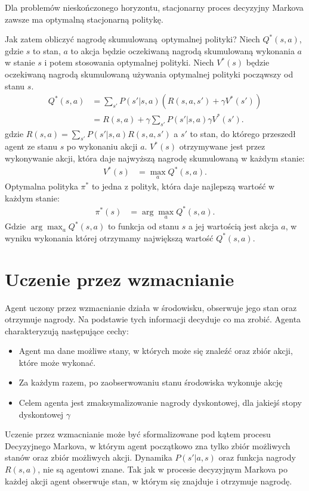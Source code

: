 \documentclass[a4paper, 12pt,oneside]{book}
\begin{document}
Dla problemów nieskończonego horyzontu, stacjonarny proces decyzyjny Markova
zawsze ma optymalną stacjonarną politykę.\cite{ai_foundations_policies}

Jak zatem obliczyć nagrodę skumulowaną optymalnej polityki? Niech $Q^*(s,a)$,
gdzie $s$ to stan, $a$ to akcja będzie oczekiwaną nagrodą skumulowaną wykonania
$a$ w stanie $s$ i potem stosowania optymalnej polityki. Niech $V^*(s)$ będzie
oczekiwaną nagrodą skumulowaną używania optymalnej polityki począwszy od stanu
$s$.
\begin{equation} \label{optimal_policy_1}
\begin{split}
	Q^*(s,a) &= \sum_{s'}P(s'|s,a)(R(s,a,s') + \gamma V^*(s'))\\
	&= R(s,a) + \gamma \sum_{s'}P(s'|s,a) \gamma V^*(s').
\end{split}
\end{equation}
gdzie $R(s,a) = \sum_{s'}P(s'|s,a)R(s,a,s')$ a $s'$ to stan, do którego
przeszedł agent ze stanu $s$ po wykonaniu akcji $a$.
$V^*(s)$ otrzymywane jest przez wykonywanie akcji, która daje najwyższą nagrodę
skumulowaną w każdym stanie:
\begin{equation} \label{optimal_policy_2}
\begin{split}
	V^*(s) &= \max_{a} Q^*(s,a).
\end{split}
\end{equation}
Optymalna polityka $\pi^*$ to jedna z polityk, która daje najlepszą wartość w
każdym stanie:
\begin{equation} \label{optimal_policy_3}
\begin{split}
	\pi^*(s) &= \arg\max_{a} Q^*(s,a).
\end{split}
\end{equation}
Gdzie $\arg\max_{a} Q^*(s,a)$ to funkcja od stanu $s$ a jej wartością jest
akcja $a$, w wyniku wykonania której otrzymamy największą wartość $Q^*(s,a)$.

\section{Uczenie przez wzmacnianie}
Agent uczony przez wzmacnianie działa w środowisku, obserwuje jego stan oraz
otrzymuje nagrody. Na podstawie tych informacji decyduje co ma zrobić. Agenta
charakteryzują następujące cechy:
\begin{itemize}
	\setlength\itemsep{-0.4em}
\item Agent ma dane możliwe stany, w których może się znaleźć oraz zbiór akcji,
	które może wykonać.
\item Za każdym razem, po zaobserwowaniu stanu środowiska wykonuje akcję
\item Celem agenta jest zmaksymalizowanie nagrody dyskontowej, dla jakiejś
	stopy dyskontowej $\gamma$
\end{itemize}
Uczenie przez wzmacnianie może być sformalizowane pod kątem procesu Decyzyjnego
Markova, w którym agent początkowo zna tylko zbiór możliwych stanów oraz zbiór
możliwych akcji. Dynamika $P(s'|a,s)$ oraz funkcja nagrody $R(s,a)$, nie są
agentowi znane. Tak jak w procesie decyzyjnym Markova po każdej akcji agent
obserwuje stan, w którym się znajduje i otrzymuje nagrodę.
\end{document}
